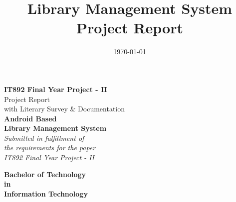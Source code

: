 \documentclass[11pt, a4paper]{thesis}
\date{\today}
\title{Library Management System Project Report}
\begin{document}
\begin{titlepage}

\begin{center}

\textup{\small {\bf IT892 Final Year Project - II} \\ Project Report\\
with Literary Survey \& Documentation}\\[0.2in]

\Large \textbf {Android Based\\Library Management System}\\[0.5in]

       \small \emph{Submitted in fulfillment of\\
        the requirements for the paper\\IT892 Final Year Project - II}
        \vspace{.1in}

       {\bf Bachelor of Technology \\in\\ Information Technology}\\[0.5in]


\end{center}
\end{titlepage}
\end{document}
